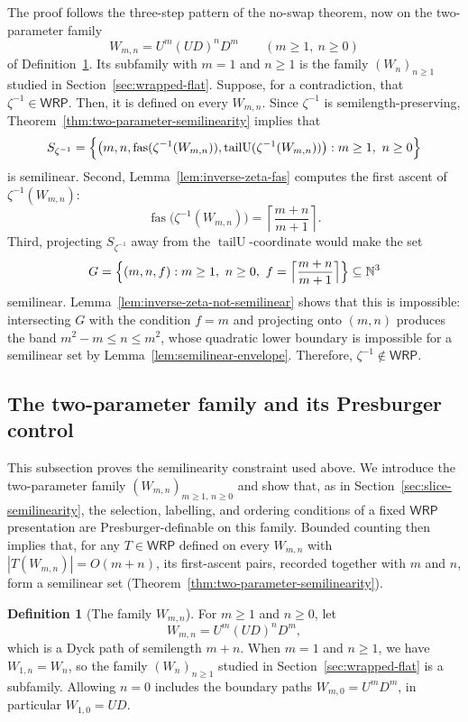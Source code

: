 \documentclass[11pt]{article}
\theoremstyle{definition}
\newtheorem{definition}[theorem]{Definition}
\newcommand{\N}{\mathbb N}
\newcommand{\WRP}{\mathsf{WRP}}
\newcommand{\fas}{\operatorname{fas}}
\newcommand{\tailU}{\operatorname{tailU}}
\begin{document}
The proof follows the three-step pattern of the no-swap theorem, now on the
two-parameter family
\[
   W_{m,n}=U^m(UD)^nD^m\qquad(m\ge 1,\ n\ge 0)
\]
of Definition~\ref{def:two-parameter-family}.  Its subfamily with $m=1$ and $n\ge1$ is
the family $(W_n)_{n\ge1}$ studied in
Section~\ref{sec:wrapped-flat}.  Suppose, for a contradiction, that
$\zeta^{-1}\in\WRP$.  Then, it is defined on every $W_{m,n}$.  Since
$\zeta^{-1}$ is semilength-preserving,
Theorem~\ref{thm:two-parameter-semilinearity} implies that
\[
   S_{\zeta^{-1}}
   =\Bigl\{\bigl(m,n,\fas(\zeta^{-1}(W_{m,n})),
                    \tailU(\zeta^{-1}(W_{m,n}))\bigr):
                    m\ge1,\ n\ge0\Bigr\}
\]
is semilinear.  Second, Lemma~\ref{lem:inverse-zeta-fas} computes the first
ascent of $\zeta^{-1}(W_{m,n})$:
\[
   \fas\bigl(\zeta^{-1}(W_{m,n})\bigr)=\left\lceil\frac{m+n}{m+1}\right\rceil.
\]
Third, projecting $S_{\zeta^{-1}}$ away from the $\tailU$-coordinate would make
the set
\[
   G=\Bigl\{(m,n,f):m\ge1,\ n\ge0,\
          f=\Bigl\lceil\frac{m+n}{m+1}\Bigr\rceil\Bigr\}\subseteq\N^3
\]
semilinear.  Lemma~\ref{lem:inverse-zeta-not-semilinear} shows that this is impossible:
intersecting $G$ with the condition $f=m$ and projecting onto $(m,n)$ produces
the band $m^2-m\le n\le m^2$, whose quadratic lower boundary is impossible for
a semilinear set by Lemma~\ref{lem:semilinear-envelope}.  Therefore,
$\zeta^{-1}\notin\WRP$.

\subsection{The two-parameter family and its Presburger control}

This subsection proves the semilinearity constraint used above.  We introduce
the two-parameter family $(W_{m,n})_{m\ge1,\,n\ge0}$ and show that, as in
Section~\ref{sec:slice-semilinearity}, the selection, labelling, and ordering
conditions of a fixed $\WRP$ presentation are Presburger-definable on this
family.  Bounded counting then implies that,
for any $T\in\WRP$ defined on every $W_{m,n}$ with
$|T(W_{m,n})|=O(m+n)$, its first-ascent pairs, recorded together with $m$ and
$n$, form a semilinear set
(Theorem~\ref{thm:two-parameter-semilinearity}).

\begin{definition}[The family $W_{m,n}$]\label{def:two-parameter-family}
For $m\ge 1$ and $n\ge 0$, let
\[
   W_{m,n}=U^m(UD)^nD^m,
\]
which is a Dyck path of semilength $m+n$.  When $m=1$ and $n\ge1$, we have
$W_{1,n}=W_n$, so the family $(W_n)_{n\ge1}$ studied in
Section~\ref{sec:wrapped-flat} is a subfamily.  Allowing $n=0$ includes the
boundary paths $W_{m,0}=U^mD^m$, in particular $W_{1,0}=UD$.
\end{definition}
\end{document}
